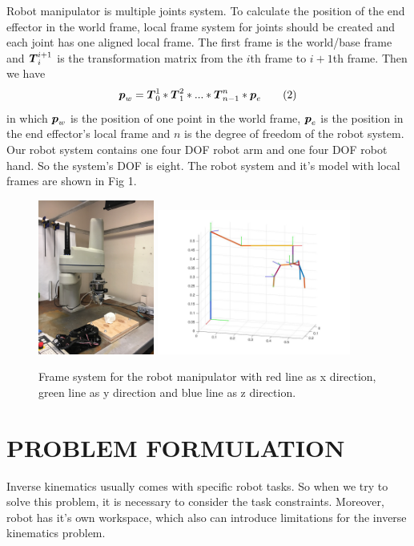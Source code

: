 \documentclass[journal,comsoc]{IEEEtran}
\begin{document}
Robot manipulator is multiple joints system.  To calculate the position of the end effector in the world frame, local frame system for joints should be created and each joint has one aligned local frame.
 The first frame is the world/base frame and $\mbox{\boldmath $T$}_i^{i+1}$ is the transformation matrix from the $i$th frame to $i+1$th frame.  Then we have 
\[
\mbox{\boldmath $p$}_w = \mbox{\boldmath $T$}_0^1*\mbox{\boldmath $T$}_1^2*... *\mbox{\boldmath $T$}_{n-1}^n * \mbox{\boldmath $p$}_e \tag{2}
\]
 in which $\mbox{\boldmath $p$}_w$ is the position of one point in the world frame, $\mbox{\boldmath $p$}_e$ is the position in the end effector's local frame and $n$ is the degree of freedom of the robot system.\\

Our robot system contains one four DOF robot arm and one four DOF robot hand. So the system's DOF is eight. The robot system and it's model with local frames are shown in Fig 1. 
 
\begin{figure}[!t]
\centering
\includegraphics[width=1.5in, height=2.0in]{IMG_5860.jpg}
\includegraphics[width=2.5in]{frames.jpg}
\caption{Frame system for the robot manipulator with red line as x direction, green line as y direction and blue line as z direction. }
\label{fig_sim }
\end{figure}

 

\section{PROBLEM FORMULATION}
Inverse kinematics usually comes with  specific robot tasks.  So when we try to solve this problem, it is necessary to consider the task constraints. Moreover, robot has it's own workspace, which also can introduce limitations for the inverse kinematics problem. \\ 
\end{document}
